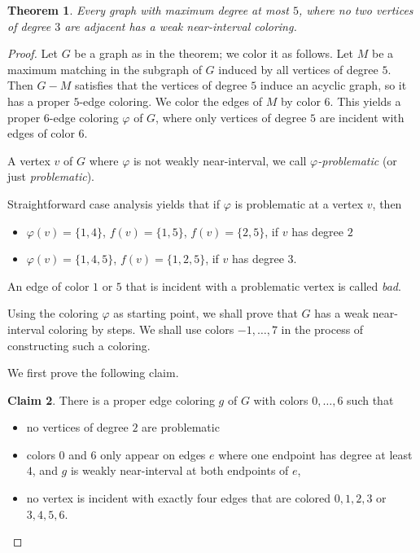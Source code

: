 \documentclass[12pt]{article}
\theoremstyle{plain}
\newtheorem{theorem}{Theorem}[section]
\theoremstyle{definition}
\newtheorem{claim}[theorem]{Claim}
\numberwithin{equation}{section}
\begin{document}
\begin{theorem}
	Every graph with maximum degree at most $5$, where no two vertices of degree $3$ are
	adjacent has a weak near-interval coloring.
\end{theorem}
\begin{proof}
	Let $G$ be a graph as in the theorem;
	we color it as follows. Let $M$ be a maximum matching in the subgraph of $G$ induced
	by all vertices of degree $5$. Then $G-M$ satisfies that the vertices of degree $5$ induce
	an acyclic graph, so it has a proper $5$-edge coloring. We color the edges of $M$ by color $6$.
	This yields a proper $6$-edge coloring $\varphi$ of $G$, where only vertices of degree $5$ are incident with
	edges of color $6$.

	A vertex $v$ of $G$ where $\varphi$ is not weakly near-interval, we call {\em $\varphi$-problematic} (or just {\em problematic}).
	
	Straightforward case analysis yields that if $\varphi$ is problematic at a vertex $v$, then
\begin{itemize}

	\item $\varphi(v)=\{1,4\}$, $f(v)=\{1,5\}$, $f(v)=\{2,5\}$, if $v$ has degree $2$

	\item $\varphi(v)=\{1,4,5\}$, $f(v)=\{1,2,5\}$, if $v$ has degree $3$.

\end{itemize}

	An edge of color $1$ or $5$ that is incident with a problematic vertex is called {\em bad}.
	
	Using the coloring $\varphi$ as starting point, we shall prove that $G$ has a weak near-interval
	coloring by steps. We shall use colors $-1, \dots, 7$ in the process of constructing such a coloring.


	We first prove the following claim.

\begin{claim}
\label{cl:prob2}
	There is a proper edge coloring $g$ of $G$ with colors $0, \dots, 6$ such that
\begin{itemize}
	\item[(a)] no vertices of degree $2$ are problematic

	\item[(b)] colors $0$ and $6$ only appear on edges $e$ where one endpoint has degree at least $4$, and $g$
	is weakly near-interval at both endpoints of $e$,

	\item[(c)] no vertex is incident with exactly four edges that are colored $0,1,2,3$ or $3,4,5,6$.
\end{itemize}
\end{claim}


\end{proof}
\end{document}
